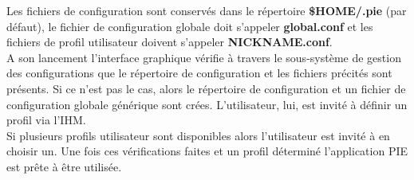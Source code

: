 Les fichiers de configuration sont conservés dans le répertoire \textbf{\$HOME/.pie} (par défaut), le fichier
de configuration globale doit s'appeler \textbf{global.conf} et les fichiers de profil utilisateur doivent
s'appeler \textbf{NICKNAME.conf}. \\

A son lancement l'interface graphique vérifie à travers le sous-système de gestion des configurations
que le répertoire de configuration et les fichiers précités sont présents. Si ce n'est pas le cas, alors le
répertoire de configuration et un fichier de configuration globale générique sont crées. L'utilisateur, lui,
est invité à définir un profil via l'IHM. \\

Si plusieurs profils utilisateur sont disponibles alors l'utilisateur est invité à en choisir un. Une fois ces
vérifications faites et un profil déterminé l'application PIE est prête à être utilisée.

